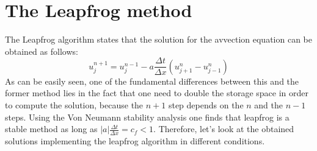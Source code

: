 \documentclass[11pt,a4paper]{article}
\begin{document}
\section{The Leapfrog method}
The Leapfrog algorithm states that the solution for the avvection equation can be obtained as follows:
\begin{equation}
u_j^{n+1} = u_j^{n-1} - a\frac{\Delta t}{\Delta x} ( u_{j+1}^n - u_{j-1}^n)
\end{equation}
As can be easily seen, one of the fundamental differences between this and the former method lies in the fact that one need to double the storage space in order to compute the solution, because the $n+1$ step depends on the $n$ and the $n-1$ steps. Using the Von Neumann stability analysis one finds that leapfrog is a stable method as long as $|a|\frac{\Delta t}{\Delta x} = c_f < 1$. Therefore, let's look at the obtained solutions implementing the leapfrog algorithm in different conditions.
\end{document}
